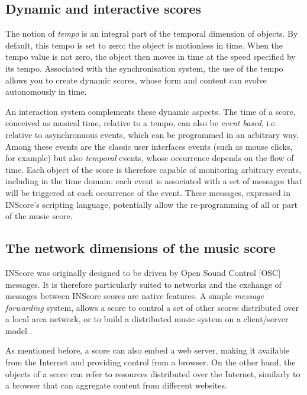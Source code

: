 \documentclass{article}
\begin{document}
\subsection{Dynamic and interactive scores}

The notion of \emph{tempo} is an integral part of the temporal dimension of objects. By default, this tempo is set to zero: the object is motionless in time. When the tempo value is not zero, the object then moves in time at the speed specified by its tempo. Associated with the synchronisation system, the use of the tempo allows you to create dynamic scores, whose form and content can evolve autonomously in time.

An interaction system complements these dynamic aspects. The time of a score, conceived as musical time, relative to a tempo, can also be \emph{event based}, i.e. relative to asynchronuous events, which can be programmed in an arbitrary way. Among these events are the classic user interfaces events (such as mouse clicks, for example) but also \emph{temporal} events, whose occurrence depends on the flow of time. Each object of the score is therefore capable of monitoring arbitrary events, including in the time domain: each event is associated with a set of messages that will be triggered at each occurrence of the event. These messages, expressed in INScore's scripting language, potentially allow the re-programming of all or part of the music score.

\subsection{The network dimensions of the music score}

INScore was originally designed to be driven by Open Sound Control [OSC] messages. It is therefore particularly suited to networks and the exchange of messages between INScore scores are native features. A simple \emph{message forwarding} system, allows a score to control a set of other scores distributed over a local area network, or to build a distributed music system on a client/server model \cite{Zagorac_tenor2018}.

As mentioned before, a score can also embed a web server, making it available from the Internet and providing control from a browser. On the other hand, the objects of a score can refer to resources distributed over the Internet, similarly to a browser that can aggregate content from different websites.
\end{document}
